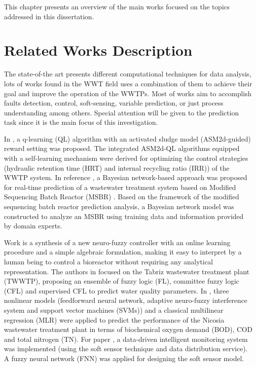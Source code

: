 This chapter presents an overview of the main works focused on the topics addressed in this dissertation.

\section{Related Works Description}
\label{s:RelatedWorks-Description}

The state-of-the art presents different computational techniques for data analysis, lots of works found in the \ac{WWT} field uses a combination of them to achieve their goal and improve the operation of the \acs{WWTP}s. Most of works aim to accomplish faults detection, control, soft-sensing, variable prediction, or just process understanding among others. Special attention will be given to the prediction task since it is the main focus of this investigation.

In \cite{Pang2019}, a q-learning (QL) algorithm with an activated sludge model (ASM2d-guided) reward setting was proposed. The integrated ASM2d-QL algorithms equipped with a self-learning mechanism were derived for optimizing the control strategies (hydraulic retention time (HRT) and internal recycling ratio (IRR)) of the WWTP system. In reference \cite{Li2013}, a Bayesian network-based approach was proposed for real-time prediction of a wastewater treatment system based on Modified Sequencing Batch Reactor (MSBR) . Based on the framework of the modified sequencing batch reactor prediction analysis, a Bayesian network model was constructed to analyze an MSBR using training data and information provided by domain experts.

Work \cite{Haggege2005} is a synthesis of a new neuro-fuzzy controller with an online learning procedure and a simple algebraic formulation, making it easy to interpret by a human being to control a bioreactor without requiring any analytical representation. The authors in \cite{Nadiri2018} focused on the Tabriz wastewater treatment plant (TWWTP), proposing an ensemble of fuzzy logic (FL), committee fuzzy logic (CFL)  and supervised CFL to predict water quality parameters. In \cite{Nourani2018}, three nonlinear models (feedforward neural network, adaptive neuro-fuzzy interference system and support vector machines (SVMs)) and a classical multilinear regression (MLR) were applied to predict the performance of the Nicosia wastewater treatment plant in terms of biochemical oxygen demand (BOD), COD and total nitrogen (TN). For paper \cite{Han2018}, a data-driven intelligent monitoring system was implemented (using the soft sensor technique and data distribution service). A fuzzy neural network (FNN) was applied for designing the soft sensor model.

